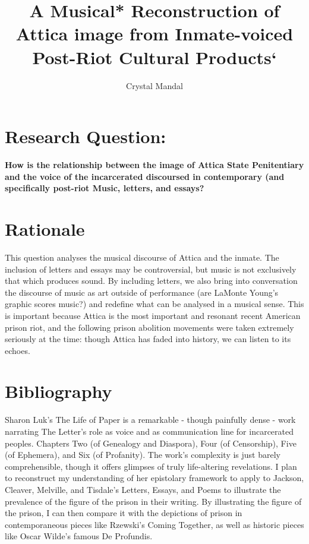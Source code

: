 \documentclass[12pt,letterpaper]{article}
\title{\vspace*{-72pt}A Musical* Reconstruction of Attica image from Inmate-voiced 
Post-Riot Cultural Products`}
\author{Crystal Mandal}
\date{}
\begin{document}
\maketitle

\section*{Research Question:}
\textbf{How is the relationship between the image of Attica State Penitentiary 
and the voice of the incarcerated discoursed in contemporary (and specifically 
post-riot Music, letters, and essays?}

\section*{Rationale}

This question analyses the musical discourse of Attica and the inmate. The 
inclusion of letters and essays may be controversial, but music is not exclusively 
that which produces sound. By including letters, we also bring into conversation 
the discourse of music as art outside of performance (are LaMonte Young's graphic 
scores music?) and redefine what can be analysed in a musical sense. This is 
important because Attica is the most important and resonant recent American 
prison riot, and the following prison abolition movements were taken extremely 
seriously at the time: though Attica has faded into history, we can listen to 
its echoes. 


\section*{Bibliography}

\begin{adjustwidth}{2.5ex}{0pt}

	Sharon Luk's The Life of Paper is a remarkable - though painfully dense - 
	work narrating The Letter's role as voice and as communication line for 
	incarcerated peoples. Chapters Two (of Genealogy and Diaspora), Four 
	(of Censorship), Five (of Ephemera), and Six (of Profanity). The work's 
	complexity is just barely comprehensible, though it offers glimpses of 
	truly life-altering revelations. I plan to reconstruct my understanding of 
	her epistolary framework to apply to Jackson, Cleaver, Melville, and 
	Tisdale's Letters, Essays, and Poems to illustrate the prevalence of the 
	figure of the prison in their writing. By illustrating the figure of the 
	prison, I can then compare it with the depictions of prison in 
	contemporaneous pieces like Rzewski's Coming Together, as well as historic 
	pieces like Oscar Wilde's famous De Profundis. 

\end{adjustwidth}
\end{document}
